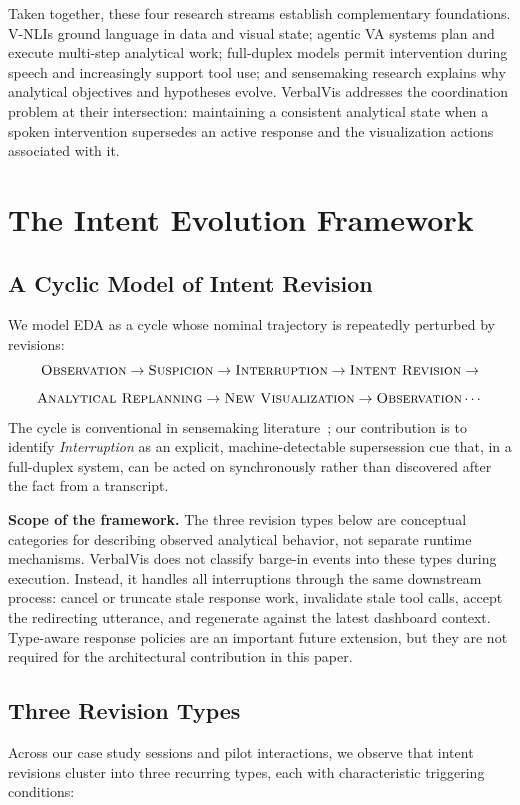 \documentclass[journal]{IEEEtran}
\begin{document}
Taken together, these four research streams establish complementary foundations. V-NLIs ground language in data and visual state; agentic VA systems plan and execute multi-step analytical work; full-duplex models permit intervention during speech and increasingly support tool use; and sensemaking research explains why analytical objectives and hypotheses evolve. VerbalVis addresses the coordination problem at their intersection: maintaining a consistent analytical state when a spoken intervention supersedes an active response and the visualization actions associated with it.

\section{The Intent Evolution Framework}
\label{sec:framework}

\subsection{A Cyclic Model of Intent Revision}
We model EDA as a cycle whose nominal trajectory is repeatedly perturbed by revisions:
\[
\textsc{Observation} \rightarrow \textsc{Suspicion} \rightarrow \textsc{Interruption} \rightarrow \textsc{Intent Revision} \rightarrow
\]
\[
\textsc{Analytical Replanning} \rightarrow \textsc{New Visualization} \rightarrow \textsc{Observation} \cdots
\]
The cycle is conventional in sensemaking literature~\cite{pirolli2005sensemaking}; our contribution is to identify \emph{Interruption} as an explicit, machine-detectable supersession cue that, in a full-duplex system, can be acted on synchronously rather than discovered after the fact from a transcript.

\noindent\textbf{Scope of the framework.}
The three revision types below are conceptual categories for describing observed analytical behavior, not separate runtime mechanisms. VerbalVis does not classify barge-in events into these types during execution. Instead, it handles all interruptions through the same downstream process: cancel or truncate stale response work, invalidate stale tool calls, accept the redirecting utterance, and regenerate against the latest dashboard context. Type-aware response policies are an important future extension, but they are not required for the architectural contribution in this paper.

\subsection{Three Revision Types}
Across our case study sessions and pilot interactions, we observe that intent revisions cluster into three recurring types, each with characteristic triggering conditions:
\end{document}
